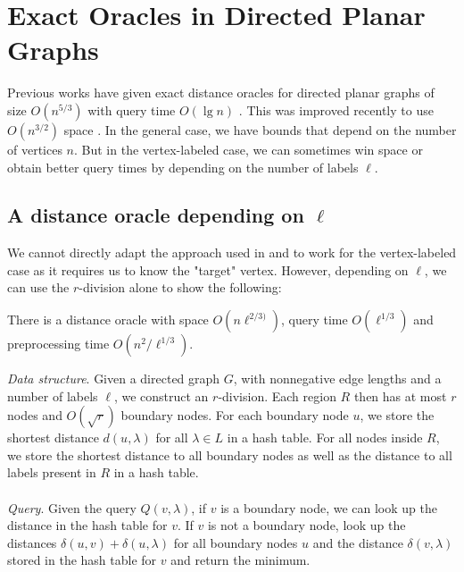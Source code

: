 \section{Exact Oracles in Directed Planar Graphs}\label{exactPlanar}

Previous works have given exact distance oracles for directed planar graphs of size
$O(n^{5/3})$ with query time $O(\lg n)$ \cite{cohen2017fast}. This was improved recently
to use $O(n^{3/2})$ space \cite{gawrychowski2017better}. In the general case, we have
bounds that depend on the number of vertices $n$. But in the vertex-labeled case, we can
sometimes win space or obtain better query times by depending on the number of labels $\ell$.

\subsection{A distance oracle depending on $\ell$}
We cannot directly adapt the approach used in \cite{cohen2017fast} and \cite{gawrychowski2017better} to work
for the vertex-labeled case as it requires us to know the "target" vertex. However,
depending on $\ell$, we can use the $r$-division alone to show the following:
\begin{thm}\label{thm1}
  There is a distance oracle with space $O(n\ell^{2/3)})$, query time $O(\ell^{1/3})$ and
  preprocessing time $O(n^2/\ell^{1/3})$.
\end{thm}
\textit{Data structure}. Given a directed graph $G$, with nonnegative edge lengths and a number of labels $\ell$, we
construct an $r$-division. Each region $R$ then has at most $r$ nodes and $O(\sqrt{r})$
boundary nodes. For each boundary node $u$, we store the shortest distance $d(u,\lambda)$
for all $\lambda \in L$ in a hash table. For all nodes inside $R$, we store the shortest
distance to all
boundary nodes as well as the distance to all labels present in $R$ in a hash table. \\
\\
\textit{Query}. Given the query $Q(v, \lambda)$, if $v$ is a boundary node, we can look
up the distance in the hash table for $v$. If $v$ is not a boundary node, look up the
distances $\delta(u,v)+\delta(u,\lambda)$ for all boundary nodes $u$ and the distance
$\delta(v,\lambda)$ stored in the hash table for $v$ and return the minimum.

